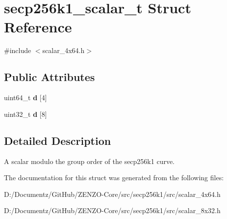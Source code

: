 \hypertarget{structsecp256k1__scalar__t}{}\section{secp256k1\+\_\+scalar\+\_\+t Struct Reference}
\label{structsecp256k1__scalar__t}


{\ttfamily \#include $<$scalar\+\_\+4x64.\+h$>$}

\subsection*{Public Attributes}
\begin{DoxyCompactItemize}
\item 
\mbox{\label{structsecp256k1__scalar__t_a23fa40eb564d5b22bacef121ca08989e}} 
uint64\+\_\+t {\bfseries d} \mbox{[}4\mbox{]}
\item 
\mbox{\label{structsecp256k1__scalar__t_a8d15cbf4135058b534c31f2cef6c1123}} 
uint32\+\_\+t {\bfseries d} \mbox{[}8\mbox{]}
\end{DoxyCompactItemize}


\subsection{Detailed Description}
A scalar modulo the group order of the secp256k1 curve. 

The documentation for this struct was generated from the following files\+:\begin{DoxyCompactItemize}
\item 
D\+:/\+Documentz/\+Git\+Hub/\+Z\+E\+N\+Z\+O-\/\+Core/src/secp256k1/src/scalar\+\_\+4x64.\+h\item 
D\+:/\+Documentz/\+Git\+Hub/\+Z\+E\+N\+Z\+O-\/\+Core/src/secp256k1/src/scalar\+\_\+8x32.\+h\end{DoxyCompactItemize}

